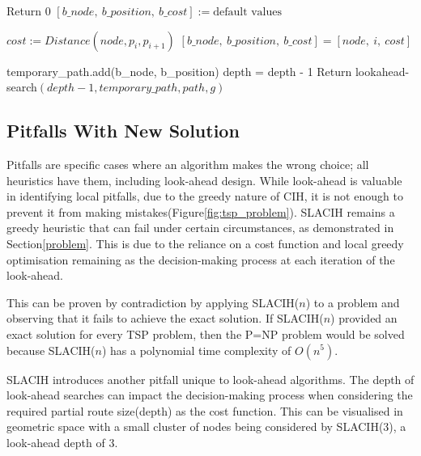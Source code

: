 \begin{algorithm}[H]
\caption{lookahead-search$(depth : \text{integer},temporary\_path : \text{path},path : \text{path}, g : \text{graph})$}
\begin{algorithmic}[1]
\State Return 0
\EndIf
\State $[b\_node,\ b\_position,\ b\_cost] := \text{default values}$

 
        \State $cost := Distance(node, p_i, p_{i+1})$ 
            \State$[b\_node,\ b\_position,\ b\_cost] = [node,\ i,\ cost]$
        \EndIf
    \EndFor
\EndFor

\State temporary\_path.add(b\_node, b\_position)
\State depth = depth - 1 
\State Return lookahead-search$(depth-1,temporary\_path, path,g)$  
\end{algorithmic}
\end{algorithm}

\subsection{Pitfalls With New Solution}
\label{pitfall}
Pitfalls are specific cases where an algorithm makes the wrong choice; all heuristics have them, including look-ahead design. While look-ahead is valuable in identifying local pitfalls, due to the greedy nature of CIH, it is not enough to prevent it from making mistakes(Figure\ref{fig:tsp_problem}). SLACIH remains a greedy heuristic that can fail under certain circumstances, as demonstrated in Section\ref{problem}. This is due to the reliance on a cost function and local greedy optimisation remaining as the decision-making process at each iteration of the look-ahead.

This can be proven by contradiction by applying SLACIH($n$) to a problem and observing that it fails to achieve the exact solution. If SLACIH($n$) provided an exact solution for every TSP problem, then the P=NP problem would be solved because SLACIH($n$) has a polynomial time complexity of $O(n^5)$.

SLACIH introduces another pitfall unique to look-ahead algorithms. The depth of look-ahead searches can impact the decision-making process when considering the required partial route size(depth) as the cost function. This can be visualised in geometric space with a small cluster of nodes being considered by SLACIH(3), a look-ahead depth of 3.

